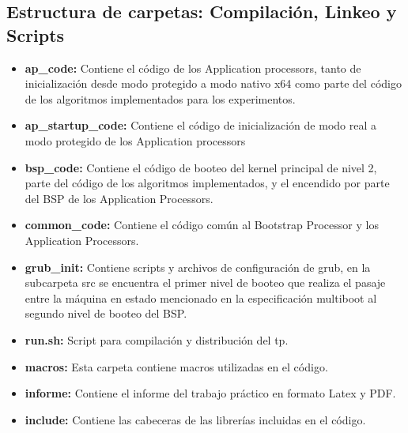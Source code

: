     \subsection{Estructura de carpetas: Compilación, Linkeo y Scripts}
    \begin{itemize}
	    \item \textbf{ap\_code: } Contiene el código de los Application processors, tanto de inicialización desde modo protegido a modo nativo x64 como parte del código de los algoritmos implementados para los experimentos.
		\item \textbf{ap\_startup\_code: } Contiene el código de inicialización de modo real a modo protegido de los Application processors
		\item \textbf{bsp\_code: } Contiene el código de booteo del kernel principal de nivel 2, parte del código de los algoritmos implementados, y el encendido por parte del BSP de los Application Processors.
		\item \textbf{common\_code: } Contiene el código común al Bootstrap Processor y los Application Processors.
		\item \textbf{grub\_init: } Contiene scripts y archivos de configuración de grub, en la subcarpeta src se encuentra el primer nivel de booteo que realiza el pasaje entre la máquina en estado mencionado en la especificación multiboot al segundo nivel de booteo del BSP.
		\item \textbf{run.sh: } Script para compilación y distribución del tp.
		\item \textbf{macros: } Esta carpeta contiene macros utilizadas en el código.
		\item \textbf{informe: } Contiene el informe del trabajo práctico en formato Latex y PDF.
		\item \textbf{include: } Contiene las cabeceras de las librerías incluidas en el código.
    \end{itemize}

